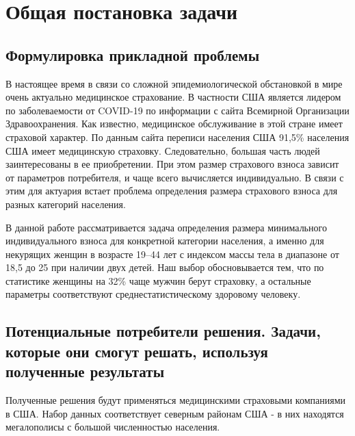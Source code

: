 \documentclass[a4paper,12pt]{article}
\begin{document}

%
\tableofcontents
\pagebreak

\section{Общая постановка задачи}
\subsection{Формулировка прикладной проблемы}
В настоящее время в связи со сложной эпидемиологической обстановкой в мире очень актуально медицинское страхование. В частности США является лидером по заболеваемости от COVID-19 по информации с сайта Всемирной Организации Здравоохранения. Как известно, медицинское обслуживание в этой стране имеет страховой характер. По данным сайта переписи населения США 91,5\% населения США имеет медицинскую страховку. Следовательно, большая часть людей заинтересованы в ее приобретении. При этом размер страхового взноса зависит от параметров потребителя, и чаще всего вычисляется индивидуально. В связи с этим для актуария встает проблема определения размера страхового взноса для разных категорий населения.

В данной работе рассматривается задача определения размера минимального индивидуального взноса для конкретной категории населения, а именно
для некурящих женщин в возрасте 19–44 лет с индексом массы тела в диапазоне от 18,5 до 25 при наличии двух детей. Наш выбор обосновывается тем, что по статистике женщины на 32\% чаще мужчин берут страховку, а остальные параметры соответствуют среднестатистическому здоровому человеку.

\subsection{Потенциальные потребители решения. Задачи, которые они смогут решать,	используя полученные результаты}
Полученные решения будут применяться медицинскими страховыми компаниями в США. Набор данных соответствует северным районам США - в них находятся мегалополисы с большой численностью населения.
\end{document}
